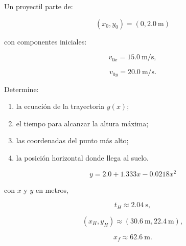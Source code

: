 \begin{ejercicio}
Un proyectil parte de:

\[
(x_0,y_0)=(0,\SI{2.0}{\meter})
\]

con componentes iniciales:

\[
v_{0x}=\SI{15.0}{\meter\per\second},
\]

\[
v_{0y}=\SI{20.0}{\meter\per\second}.
\]

Determine:

\begin{enumerate}[label=\alph*)]
    \item la ecuación de la trayectoria \(y(x)\);
    \item el tiempo para alcanzar la altura máxima;
    \item las coordenadas del punto más alto;
    \item la posición horizontal donde llega al suelo.
\end{enumerate}
\end{ejercicio}

\begin{respuesta}
\[
\boxed{
y
=
2.0
+
1.333x
-
0.0218x^2
}
\]

con \(x\) y \(y\) en metros,

\[
t_H\approx\SI{2.04}{\second},
\]

\[
(x_H,y_H)
\approx
(\SI{30.6}{\meter},\SI{22.4}{\meter}),
\]

\[
\boxed{
x_f\approx\SI{62.6}{\meter}
}.
\]
\end{respuesta}

